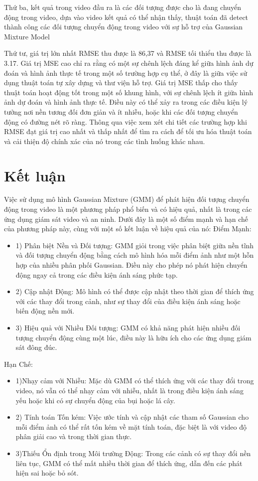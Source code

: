\documentclass[a4paper]{article}
\begin{document}
Thứ ba, kết quả trong video đầu ra là các đối tượng được cho là đang chuyển động trong video, dựa vào video kết quả có thể nhận thấy, thuật toán đã detect thành công các đối tượng chuyển động trong video với sự hỗ trợ của Gaussian Mixture Model

Thứ tư, giá trị lớn nhất RMSE thu được là 86,37 và RMSE tối thiểu thu được là 3.17. Giá trị MSE cao chỉ ra rằng có một sự chênh lệch đáng kể giữa hình ảnh dự đoán và hình ảnh thực tế trong một số trường hợp cụ thể, ở đây là giữa việc sử dụng thuật toán tự xây dựng và thư viện hỗ trợ. Giá trị MSE thấp cho thấy thuật toán hoạt động tốt trong một số khung hình, với sự chênh lệch ít giữa hình ảnh dự đoán và hình ảnh thực tế. Điều này có thể xảy ra trong các điều kiện lý tưởng nơi nền tương đối đơn giản và ít nhiễu, hoặc khi các đối tượng chuyển động có đường nét rõ ràng. Thông qua việc xem xét chi tiết các trường hợp khi RMSE đạt giá trị cao nhất và thấp nhất để tìm ra cách để tối ưu hóa thuật toán và cải thiện độ chính xác của nó trong các tình huống khác nhau.

\section{Kết luận}
Việc sử dụng mô hình Gaussian Mixture (GMM) để phát hiện đối tượng chuyển động trong video là một phương pháp phổ biến và có hiệu quả, nhất là trong các ứng dụng giám sát video và an ninh. Dưới đây là một số điểm mạnh và hạn chế của phương pháp này, cùng với một số kết luận về hiệu quả của nó:
Điểm Mạnh:
\begin{itemize}[label={}]
    \item 1) Phân biệt Nền và Đối tượng: GMM giỏi trong việc phân biệt giữa nền tĩnh và đối tượng chuyển động bằng cách mô hình hóa mỗi điểm ảnh như một hỗn hợp của nhiều phân phối Gaussian. Điều này cho phép nó phát hiện chuyển động ngay cả trong các điều kiện ánh sáng phức tạp.
    \item 2) Cập nhật Động: Mô hình có thể được cập nhật theo thời gian để thích ứng với các thay đổi trong cảnh, như sự thay đổi của điều kiện ánh sáng hoặc biến động nền mới.
    \item 3) Hiệu quả với Nhiều Đối tượng: GMM có khả năng phát hiện nhiều đối tượng chuyển động cùng một lúc, điều này là hữu ích cho các ứng dụng giám sát đông đúc.
\end{itemize}
Hạn Chế:
\begin{itemize}[label={}]
    \item 1)Nhạy cảm với Nhiễu: Mặc dù GMM có thể thích ứng với các thay đổi trong video, nó vẫn có thể nhạy cảm với nhiễu, nhất là trong điều kiện ánh sáng yếu hoặc khi có sự chuyển động của bụi hoặc lá cây.
    \item 2) Tính toán Tốn kém: Việc ước tính và cập nhật các tham số Gaussian cho mỗi điểm ảnh có thể rất tốn kém về mặt tính toán, đặc biệt là với video độ phân giải cao và trong thời gian thực.
    \item 3)Thiếu Ổn định trong Môi trường Động: Trong các cảnh có sự thay đổi nền liên tục, GMM có thể mất nhiều thời gian để thích ứng, dẫn đến các phát hiện sai hoặc bỏ sót.
\end{itemize}
\end{document}
